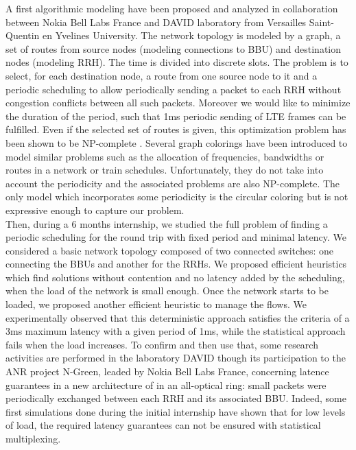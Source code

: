\documentclass{article}
\begin{document}
A first algorithmic modeling have been proposed and analyzed in collaboration between Nokia Bell Labs France and DAVID laboratory from Versailles Saint-Quentin en Yvelines University. The network topology is modeled by a graph, a set of routes from source nodes (modeling connections to BBU) and destination nodes (modeling RRH). The time is divided into discrete slots. The problem is to select, for each destination node, a route from one source node to it and a periodic scheduling to allow periodically sending a packet to each RRH without congestion conflicts between all such packets. Moreover we would like to minimize the duration of the period, such that 1ms periodic sending of LTE frames can be fulfilled. Even if the selected set of routes is given, this optimization problem has been shown to be NP-complete \cite{rapportstage}. Several graph colorings have been introduced to model similar problems such as the allocation of frequencies\cite{borndorfer1998frequency},  bandwidths\cite{erlebach2001complexity} or routes\cite{cole1996benefit} in a network or train schedules\cite{strotmann2007railway}. Unfortunately, they do not take into account the periodicity and the associated problems are also NP-complete. The only model which incorporates some periodicity is the circular coloring\cite{zhu2006recent,zhou2013multiple,zhu2001circular} but is not expressive enough to capture our problem.\\

Then, during a 6 months internship, we studied the full problem of finding a periodic scheduling for the round trip with fixed period and minimal latency. We considered a basic network topology composed of two connected switches: one connecting the BBUs and another for the RRHs. We proposed efficient heuristics which find solutions without contention and no latency added by the scheduling, when the load of the network is small enough. Once the network starts to be loaded, we proposed another efficient heuristic to manage the flows. We experimentally observed that this deterministic approach satisfies the criteria of a 3ms maximum latency with a given period of 1ms, while the statistical approach fails when the load increases. To confirm and then use that, some research activities are performed in the laboratory DAVID though its participation to the ANR project N-Green, leaded by Nokia Bell Labs France, concerning latence guarantees in a new architecture of in an all-optical ring: small packets were periodically exchanged between each RRH and its associated BBU. Indeed, some first simulations done during the initial internship have shown that for low levels of load, the required latency guarantees can not be ensured with statistical multiplexing.\\
\end{document}
